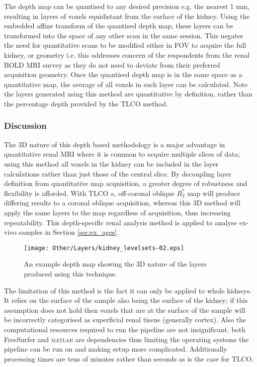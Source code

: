 The depth map can be quantised to any desired precision e.g. the nearest 1 mm, resulting in layers of voxels equidistant from the surface of the kidney. Using the embedded affine transform of the quantised depth map, these layers can be transformed into the space of any other scan in the same session. This negates the need for quantitative scans to be modified either in \ac{FOV} to acquire the full kidney, or geometry i.e. this addresses concern of the respondents from the renal \ac{BOLD} \ac{MRI} survey as they do not need to deviate from their preferred acquisition geometry. Once the quantised depth map is in the same space as a quantitative map, the average of all voxels in each layer can be calculated. Note the layers generated using this method are quantitative by definition, rather than the percentage depth provided by the \ac{TLCO} method.

\subsubsection{Discussion}
The 3D nature of this depth based methodology is a major advantage in quantitative renal \ac{MRI} where it is common to acquire multiple slices of data; using this method all voxels in the kidney can be included in the layer calculations rather than just those of the central slice. By decoupling layer definition from quantitative map acquisition, a greater degree of robustness and flexibility is afforded. With \ac{TLCO} a, off-coronal oblique $R_2^*$ map will produce differing results to a coronal oblique acquisition, whereas this 3D method will apply the same layers to the map regardless of acquisition, thus increasing repeatability. This depth-specific renal analysis method is applied to analyse ex-vivo samples in Section \ref{sec:ex_ages}.

\begin{figure}[H]
	\centering
	\texttt{[image: Other/Layers/kidney\_levelsets-02.eps]}
	\caption{An example depth map showing the 3D nature of the layers produced using this technique.}
	\label{fig:ex_layers_kidney}
\end{figure}

The limitation of this method is the fact it can only be applied to whole kidneys. It relies on the surface of the sample also being the surface of the kidney; if this assumption does not hold then voxels that are at the surface of the sample will be incorrectly categorised as superficial renal tissue (generally cortex). Also the computational resources required to run the pipeline are not insignificant, both FreeSurfer and \textsc{matlab} are dependencies thus limiting the operating systems the pipeline can be run on and making setup more complicated. Additionally processing times are tens of minutes rather than seconds as is the case for \ac{TLCO}.

